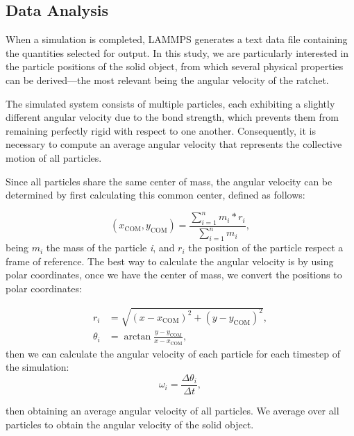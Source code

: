 \subsection{Data Analysis}

When a simulation is completed, LAMMPS generates a text data file containing the quantities selected for output. In this study, we are particularly interested in the particle positions of the solid object, from which several physical properties can be derived—the most relevant being the angular velocity of the ratchet.

The simulated system consists of multiple particles, each exhibiting a slightly different angular velocity due to the bond strength, which prevents them from remaining perfectly rigid with respect to one another. Consequently, it is necessary to compute an average angular velocity that represents the collective motion of all particles.

Since all particles share the same center of mass, the angular velocity can be determined by first calculating this common center, defined as follows:

\begin{equation}
  (x_{\mathrm{COM}}, y_{\mathrm{COM}}) = \displaystyle\frac{\sum^{n}_{i=1} m_i * r_i}{\sum^{n}_{i=1} m_i},
  \label{eq:centerofmass}
\end{equation}
being $m_i$ the mass of the particle \textit{i}, and $r_i$ the position of the particle respect a frame of reference. The best way to calculate the angular velocity is by using polar coordinates, once we have the center of mass, we convert the positions to polar coordinates:

\begin{align}
  r_i & = \sqrt{(x - x_{\mathrm{COM}})^2 + (y - y_{\mathrm{COM}})^2},\\ 
  \theta _i &= \arctan{\frac{y - y_{\mathrm{COM}}}{x - x_{\mathrm{COM}}}},
\end{align}
then we can calculate the angular velocity of each particle for each timestep of the simulation:
\begin{equation}
  \omega _i = \frac{\Delta \theta _i}{\Delta t},
  \label{eq:angularvelocity}
\end{equation}

then obtaining an average angular velocity of all particles. We average over all particles to obtain the angular velocity of the solid object.

